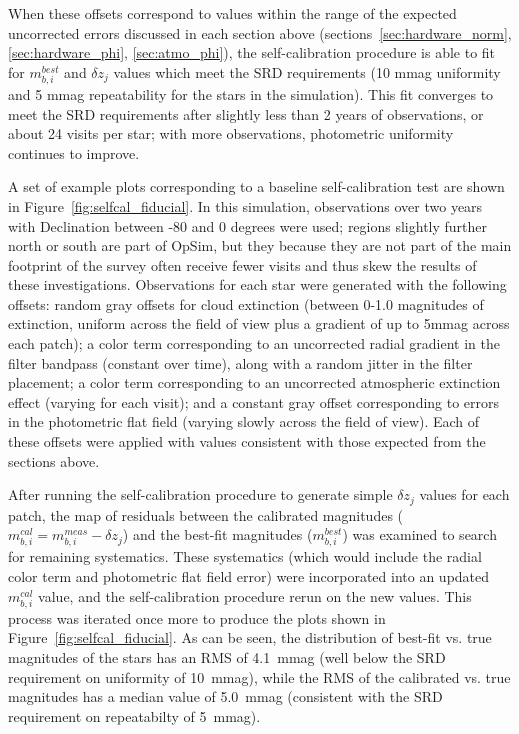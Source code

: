 \documentclass[12pt,preprint]{aastex}
\begin{document}
When these offsets correspond to values within the range of the
expected uncorrected errors discussed in each section above
(sections~\ref{sec:hardware_norm}, \ref{sec:hardware_phi},
\ref{sec:atmo_phi}), the self-calibration procedure is able to fit for
$m_{b,i}^{best}$ and $\delta z_j$ values which meet the SRD
requirements (10 mmag uniformity and 5 mmag repeatability for the
stars in the simulation).  This fit converges to meet the SRD
requirements after slightly less than 2 years of observations, or
about 24 visits per star; with more observations, photometric
uniformity continues to improve.

A set of example plots corresponding to a baseline self-calibration
test are shown in Figure~\ref{fig:selfcal_fiducial}.  In this
simulation, observations over two years with Declination between -80
and 0 degrees were used; regions slightly further north or south are
part of OpSim, but they because they are not part of the main footprint of
the survey often receive fewer visits and thus skew the results of
these investigations. Observations for each star were generated with
the following offsets: random gray offsets for cloud extinction
(between 0-1.0 magnitudes of extinction, uniform across the field of
view plus a gradient of up to 5mmag across each patch); a color term
corresponding to an uncorrected radial gradient in the filter bandpass
(constant over time), along with a random jitter in the filter
placement; a color term corresponding to an uncorrected atmospheric
extinction effect (varying for each visit); and a constant gray offset
corresponding to errors in the photometric flat field (varying slowly
across the field of view). Each of these offsets were applied with
values consistent with those expected from the sections above.

 After running the self-calibration procedure to generate simple
$\delta z_j$ values for each patch, the map of residuals between the
calibrated magnitudes ($m_{b,i}^{cal} = m_{b,i}^{meas} - \delta z_j$)
and the best-fit magnitudes ($m_{b,i}^{best}$) was examined to search
for remaining systematics. These systematics (which would include the
radial color term and photometric flat field error) were incorporated
into an updated $m_{b,i}^{cal}$ value, and the self-calibration
procedure rerun on the new values. This process was iterated once more
to produce the plots shown in Figure~\ref{fig:selfcal_fiducial}. As
can be seen, the distribution of best-fit vs. true magnitudes of the
stars has an RMS of 4.1~mmag (well below the SRD requirement on
uniformity of 10~mmag), while the RMS of the calibrated vs. true
magnitudes has a median value of 5.0~mmag (consistent with the SRD
requirement on repeatabilty of 5~mmag).
\end{document}
